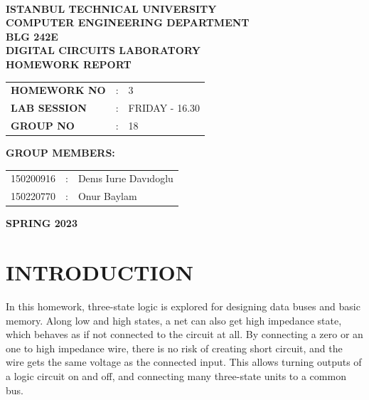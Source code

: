 \documentclass[pdftex,12pt,a4paper]{article}
\begin{document}
\begin{titlepage}
\begin{center}
\textbf{}\\
\textbf{\Large{ISTANBUL TECHNICAL UNIVERSITY}}\\
\vspace{0.5cm}
\textbf{\Large{COMPUTER ENGINEERING DEPARTMENT}}\\
\vspace{2cm}
\textbf{\Large{BLG 242E\\ DIGITAL CIRCUITS LABORATORY\\ HOMEWORK REPORT}}\\
\vspace{2.8cm}
\begin{table}[ht]
\centering
\Large{
\begin{tabular}{lcl}
\textbf{HOMEWORK NO}  & : & 3 \\
\textbf{LAB SESSION}  & : & FRIDAY - 16.30 \\
\textbf{GROUP NO}  & : & 18 \\
\end{tabular}}
\end{table}
\vspace{1cm}
\textbf{\Large{GROUP MEMBERS:}}\\
\begin{table}[ht]
\centering
\Large{
\begin{tabular}{rcl}
150200916  & : & Denıs Iurıe Davıdoglu \\
150220770  & : & Onur Baylam \\
\end{tabular}}
\end{table}
\vspace{2.8cm}
\textbf{\Large{SPRING 2023}}

\end{center}

\end{titlepage}

\thispagestyle{empty}
\setcounter{tocdepth}{4}
\tableofcontents
\clearpage

\setcounter{page}{1}

\section{INTRODUCTION}

In this homework, three-state logic is explored for designing data buses and basic memory. Along low and high states, a net can also get high impedance state, which behaves as if not connected to the circuit at all. By connecting a zero or an one to high impedance wire, there is no risk of creating short circuit, and the wire gets the same voltage as the connected input. This allows turning outputs of a logic circuit on and off, and connecting many three-state units to a common bus.
\end{document}
